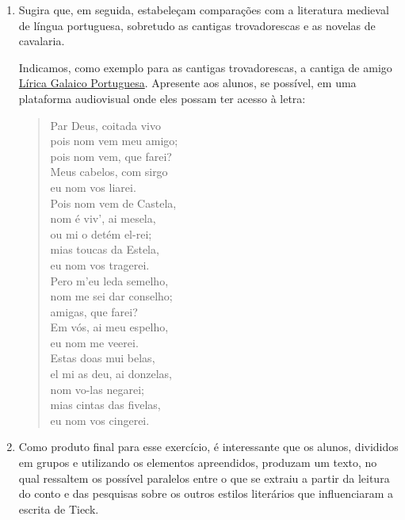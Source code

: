 \documentclass[12pt]{extarticle}
\begin{document}
\begin{enumerate}
 

\item 
Sugira que, em seguida, estabeleçam comparações com a 
literatura medieval de língua portuguesa, sobretudo as 
cantigas trovadorescas e as novelas de
cavalaria.

Indicamos, como exemplo para as cantigas trovadorescas, a cantiga de amigo 
\href{https://www.youtube.com/watch?v=1M_VcqHoQ1M\&ab_channel=Am\%C3\%A9ricoValente}{Lírica Galaico Portuguesa}. 
Apresente aos alunos, se possível, em uma plataforma audiovisual onde eles possam 
ter acesso à letra: 

\begin{verse}
Par Deus, coitada vivo\\
pois nom vem meu amigo;\\
pois nom vem, que farei?\\
Meus cabelos, com sirgo\\
eu nom vos liarei.\\
Pois nom vem de Castela,\\
nom é viv', ai mesela,\\
ou mi o detém el-rei;\\
mias toucas da Estela,\\
eu nom vos tragerei.\\
Pero m'eu leda semelho,\\
nom me sei dar conselho;\\
amigas, que farei?\\
Em vós, ai meu espelho,\\
eu nom me veerei.\\  
Estas doas mui belas,\\
el mi as deu, ai donzelas,\\
nom vo-las negarei;\\
mias cintas das fivelas,\\
eu nom vos cingerei.\\
\end{verse}

\item 
Como produto final para esse exercício, é interessante que os alunos, divididos em
grupos e utilizando os elementos apreendidos, produzam um texto, no qual
ressaltem os possível paralelos entre o que se extraiu a partir da leitura do 
conto e das pesquisas sobre os outros estilos literários que influenciaram a 
escrita de Tieck.

\end{enumerate}
\end{document}
